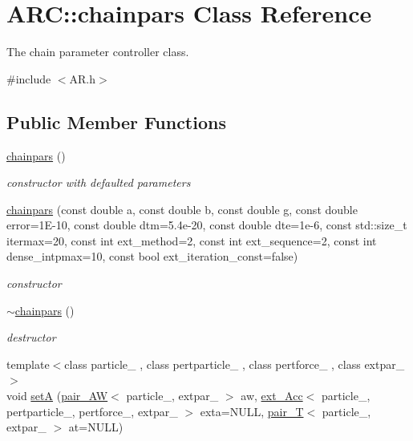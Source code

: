 \hypertarget{classARC_1_1chainpars}{}\section{A\+RC\+:\+:chainpars Class Reference}
\label{classARC_1_1chainpars}


The chain parameter controller class.  




{\ttfamily \#include $<$A\+R.\+h$>$}

\subsection*{Public Member Functions}
\begin{DoxyCompactItemize}
\item 
\hyperlink{classARC_1_1chainpars_a2019a609d85e2b801f306ac8c7f268ab}{chainpars} ()
\begin{DoxyCompactList}\small\item\em constructor with defaulted parameters \end{DoxyCompactList}\item 
\hyperlink{classARC_1_1chainpars_a26235d742aafa97dcaad75a5db74141e}{chainpars} (const double a, const double b, const double g, const double error=1\+E-\/10, const double dtm=5.\+4e-\/20, const double dte=1e-\/6, const std\+::size\+\_\+t itermax=20, const int ext\+\_\+method=2, const int ext\+\_\+sequence=2, const int dense\+\_\+intpmax=10, const bool ext\+\_\+iteration\+\_\+const=false)
\begin{DoxyCompactList}\small\item\em constructor \end{DoxyCompactList}\item 
\hyperlink{classARC_1_1chainpars_a032873f782645efb6e60dc77f6d425dc}{$\sim$chainpars} ()
\begin{DoxyCompactList}\small\item\em destructor \end{DoxyCompactList}\item 
{\footnotesize template$<$class particle\+\_\+ , class pertparticle\+\_\+ , class pertforce\+\_\+ , class extpar\+\_\+ $>$ }\\void \hyperlink{classARC_1_1chainpars_ab66fadaa08cb449e1b49dd58e2d4b14f}{setA} (\hyperlink{namespaceARC_afc1f57a75859038cbd2492366fd1849c}{pair\+\_\+\+AW}$<$ particle\+\_\+, extpar\+\_\+ $>$ aw, \hyperlink{namespaceARC_aa423c7d6aff9481c040a20b3c5c6ff4e}{ext\+\_\+\+Acc}$<$ particle\+\_\+, pertparticle\+\_\+, pertforce\+\_\+, extpar\+\_\+ $>$ exta=N\+U\+LL, \hyperlink{namespaceARC_af6dbf77cf2968752315f7712eb2515a3}{pair\+\_\+T}$<$ particle\+\_\+, extpar\+\_\+ $>$ at=N\+U\+LL)

\end{DoxyCompactItemize}
